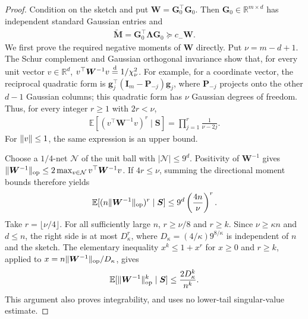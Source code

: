 \documentclass{article}
\theoremstyle{plain}
\theoremstyle{definition}
\theoremstyle{definition}
\DeclarePairedDelimiter\norm{\lVert}{\rVert}
\def\R{{\mathbb{R}}}
\def\E{{\mathbb{E}}}
\def\mathbold{\boldsymbol}
\def\cal{\mathcal}
\def\bg{\mathbold{g}}\def\ghat{\widehat{g}}\def\gtil{\widetilde{g}}
\def\bG{\mathbold{G}}\def\calG{{\cal G}}\def\scrG{{\mathscr G}}\def\Ghat{\widehat{G}}\def\Gtil{{\widetilde G}}
\def\bI{\mathbold{I}}\def\hbI{{\widehat{\bI}}}\def\tbI{{\widetilde{\bI}}}
\def\bM{\mathbold{M}}\def\hbM{{\widehat{\bM}}}\def\tbM{{\widetilde{\bM}}}
\def\bP{\mathbold{P}}\def\hbP{{\widehat{\bP}}}\def\tbP{{\widetilde{\bP}}}
\def\bS{\mathbold{S}}\def\hbS{{\widehat{\bS}}}\def\tbS{{\widetilde{\bS}}}
\def\bW{\mathbold{W}}\def\hbW{{\widehat{\bW}}}\def\tbW{{\widetilde{\bW}}}
\def\bLambda{\mathbold{\Lambda}}\def\hbLambda{{\widehat{\bLambda}}}
\begin{document}
\begin{proof}
Condition on the sketch and put $\bW=\bG_0^\top\bG_0$.
Then $\bG_0\in\R^{m\times d}$ has independent standard Gaussian entries and
\begin{align}
    \widetilde{\bM}=\bG_0^\top\bLambda\bG_0
    \succeq c_-\bW.
    \label{eq:M-inverse-PSD-lower}
\end{align}
We first prove the required negative moments of $\bW$ directly.
Put $\nu=m-d+1$. The Schur complement and Gaussian orthogonal invariance
show that, for every unit vector $v\in\R^d$,
$v^\top\bW^{-1}v\stackrel{\rm d}{=}1/\chi^2_\nu$.
For example, for a coordinate vector, the reciprocal quadratic form is
$\bg_j^\top(\bI_m-\bP_{-j})\bg_j$, where $\bP_{-j}$ projects onto
the other $d-1$ Gaussian columns; this quadratic form has $\nu$ Gaussian degrees of freedom.
Thus, for every integer $r\geq1$ with $2r<\nu$,
\begin{align*}
    \E[(v^\top\bW^{-1}v)^r\mid\bS]
       =\prod_{j=1}^r\frac1{\nu-2j}.
\end{align*}
For $\norm v\leq1$, the same expression is an upper bound.

Choose a $1/4$-net $\mathcal N$ of the unit ball with
$|\mathcal N|\leq9^d$. Positivity of $\bW^{-1}$ gives
$\norm{\bW^{-1}}_{\rm op}\leq2\max_{v\in\mathcal N}v^\top\bW^{-1}v$.
If $4r\leq\nu$, summing the directional moment bounds therefore yields
\begin{align*}
    \E[(n\norm{\bW^{-1}}_{\rm op})^r\mid\bS]
       \leq9^d\left(\frac{4n}{\nu}\right)^r.
\end{align*}
Take $r=\lfloor\nu/4\rfloor$. For all sufficiently large $n$,
$r\geq\nu/8$ and $r\geq k$. Since $\nu\geq\kappa n$ and $d\leq n$,
the right side is at most $D_\kappa^r$, where
$D_\kappa=(4/\kappa)9^{8/\kappa}$ is independent of $n$ and the sketch.
The elementary inequality $x^k\leq1+x^r$ for $x\geq0$ and $r\geq k$,
applied to $x=n\norm{\bW^{-1}}_{\rm op}/D_\kappa$, gives
\begin{align}
    \E[\norm{\bW^{-1}}_{\rm op}^k\mid\bS]
       \leq\frac{2D_\kappa^k}{n^k}.
    \label{eq:Wishart-inverse-op-moment}
\end{align}
This argument also proves integrability, and uses no lower-tail
singular-value estimate.


\end{proof}
\end{document}
